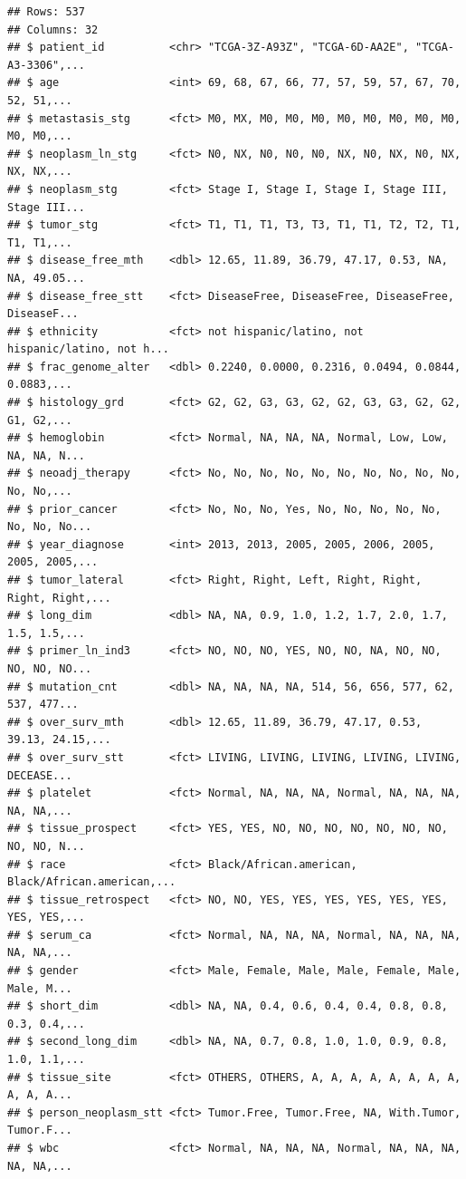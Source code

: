 \documentclass[]{article}
\begin{document}
\begin{verbatim}
## Rows: 537
## Columns: 32
## $ patient_id          <chr> "TCGA-3Z-A93Z", "TCGA-6D-AA2E", "TCGA-A3-3306",...
## $ age                 <int> 69, 68, 67, 66, 77, 57, 59, 57, 67, 70, 52, 51,...
## $ metastasis_stg      <fct> M0, MX, M0, M0, M0, M0, M0, M0, M0, M0, M0, M0,...
## $ neoplasm_ln_stg     <fct> N0, NX, N0, N0, N0, NX, N0, NX, N0, NX, NX, NX,...
## $ neoplasm_stg        <fct> Stage I, Stage I, Stage I, Stage III, Stage III...
## $ tumor_stg           <fct> T1, T1, T1, T3, T3, T1, T1, T2, T2, T1, T1, T1,...
## $ disease_free_mth    <dbl> 12.65, 11.89, 36.79, 47.17, 0.53, NA, NA, 49.05...
## $ disease_free_stt    <fct> DiseaseFree, DiseaseFree, DiseaseFree, DiseaseF...
## $ ethnicity           <fct> not hispanic/latino, not hispanic/latino, not h...
## $ frac_genome_alter   <dbl> 0.2240, 0.0000, 0.2316, 0.0494, 0.0844, 0.0883,...
## $ histology_grd       <fct> G2, G2, G3, G3, G2, G2, G3, G3, G2, G2, G1, G2,...
## $ hemoglobin          <fct> Normal, NA, NA, NA, Normal, Low, Low, NA, NA, N...
## $ neoadj_therapy      <fct> No, No, No, No, No, No, No, No, No, No, No, No,...
## $ prior_cancer        <fct> No, No, No, Yes, No, No, No, No, No, No, No, No...
## $ year_diagnose       <int> 2013, 2013, 2005, 2005, 2006, 2005, 2005, 2005,...
## $ tumor_lateral       <fct> Right, Right, Left, Right, Right, Right, Right,...
## $ long_dim            <dbl> NA, NA, 0.9, 1.0, 1.2, 1.7, 2.0, 1.7, 1.5, 1.5,...
## $ primer_ln_ind3      <fct> NO, NO, NO, YES, NO, NO, NA, NO, NO, NO, NO, NO...
## $ mutation_cnt        <dbl> NA, NA, NA, NA, 514, 56, 656, 577, 62, 537, 477...
## $ over_surv_mth       <dbl> 12.65, 11.89, 36.79, 47.17, 0.53, 39.13, 24.15,...
## $ over_surv_stt       <fct> LIVING, LIVING, LIVING, LIVING, LIVING, DECEASE...
## $ platelet            <fct> Normal, NA, NA, NA, Normal, NA, NA, NA, NA, NA,...
## $ tissue_prospect     <fct> YES, YES, NO, NO, NO, NO, NO, NO, NO, NO, NO, N...
## $ race                <fct> Black/African.american, Black/African.american,...
## $ tissue_retrospect   <fct> NO, NO, YES, YES, YES, YES, YES, YES, YES, YES,...
## $ serum_ca            <fct> Normal, NA, NA, NA, Normal, NA, NA, NA, NA, NA,...
## $ gender              <fct> Male, Female, Male, Male, Female, Male, Male, M...
## $ short_dim           <dbl> NA, NA, 0.4, 0.6, 0.4, 0.4, 0.8, 0.8, 0.3, 0.4,...
## $ second_long_dim     <dbl> NA, NA, 0.7, 0.8, 1.0, 1.0, 0.9, 0.8, 1.0, 1.1,...
## $ tissue_site         <fct> OTHERS, OTHERS, A, A, A, A, A, A, A, A, A, A, A...
## $ person_neoplasm_stt <fct> Tumor.Free, Tumor.Free, NA, With.Tumor, Tumor.F...
## $ wbc                 <fct> Normal, NA, NA, NA, Normal, NA, NA, NA, NA, NA,...
\end{verbatim}
\end{document}
